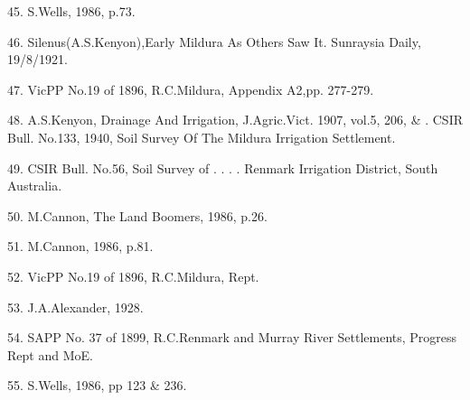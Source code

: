 45. S.Wells, 1986, p.73.

46. Silenus(A.S.Kenyon),Early Mildura As Others Saw It. Sunraysia Daily,
      19/8/1921.

47. VicPP No.19 of 1896, R.C.Mildura, Appendix A2,pp. 277-279.

48. A.S.Kenyon, Drainage And Irrigation, J.Agric.Vict. 1907, vol.5, 206, \&         .     CSIR Bull. No.133, 1940, Soil Survey Of The Mildura Irrigation 
      Settlement.

49. CSIR Bull. No.56, Soil Survey of . . . . Renmark Irrigation District, South 
       Australia.

50. M.Cannon, The Land Boomers, 1986, p.26.

51. M.Cannon, 1986, p.81.

52. VicPP No.19 of 1896, R.C.Mildura, Rept.

53. J.A.Alexander, 1928.

54. SAPP No. 37 of 1899, R.C.Renmark and Murray River Settlements,
      Progress Rept and MoE.

55. S.Wells, 1986, pp 123 \& 236.
